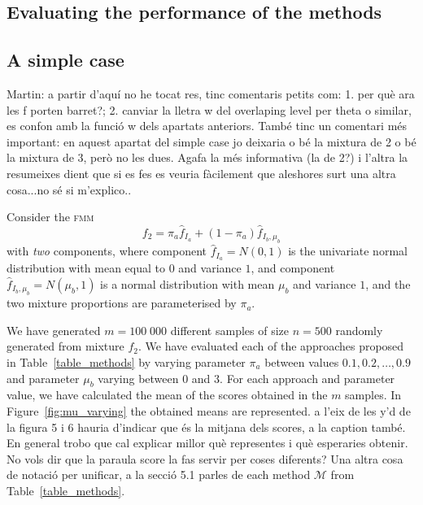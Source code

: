\documentclass[10pt, a4paper]{article}
\newcommand{\fmm}{\textsc{fmm}\xspace}
\begin{document}
\begin{spacing}{1.9}
\section{Evaluating the performance of the methods}
\label{comparison}

\subsection{A simple case}

{\color{blue} Martin: a partir d'aquí no he tocat res, tinc comentaris petits com: 1. per què ara les f porten barret?; 2. canviar la lletra w del overlaping level per theta o similar, es confon amb la funció w dels apartats anteriors. També tinc un comentari més important: en aquest apartat del simple case jo deixaria o bé la mixtura de 2 o bé la mixtura de 3, però no les dues. Agafa la més informativa (la de 2?) i l'altra la resumeixes dient que si es fes es veuria fàcilement que aleshores surt una altra cosa...no sé si m'explico..}

Consider the \fmm
\begin{equation}\label{two_mixture}
f_2 = \pi_a \hat{f}_{I_a} + (1 - \pi_a) \hat{f}_{I_b, \mu_b}
\end{equation}
with \emph{two} components, where component $\hat{f}_{I_a} = N(0, 1)$ is the univariate normal distribution with mean equal to $0$ and variance $1$, and component $\hat{f}_{I_b, \mu_b} = N(\mu_b, 1)$ is a normal distribution with mean $\mu_b$ and variance $1$, and the two mixture proportions are parameterised by $\pi_a$.

We have generated $m=100\;000$ different samples of size $n=500$ randomly generated from mixture $f_2$. We have evaluated each of the approaches proposed in Table~\ref{table_methods} by varying parameter $\pi_a$ between values $0.1, 0.2, \dots, 0.9$ and parameter $\mu_b$ varying between $0$ and $3$. For each approach and parameter value, we have calculated the mean of the scores obtained in the $m$ samples. In Figure~\ref{fig:mu_varying} the obtained means are represented. {\color{blue} a l'eix de les y'd de la figura 5 i 6 hauria d'indicar que \'{e}s la mitjana dels scores, a la caption tamb\'{e}. En general trobo que cal explicar millor qu\`{e} representes i qu\`{e} esperaries obtenir. No vols dir que la paraula score la fas servir per coses diferents? Una altra cosa de notaci\'{o} per unificar, a la secci\'{o} 5.1 parles de each method $\mathcal{M}$ from Table~\ref{table_methods}.}


\end{spacing}
\end{document}
